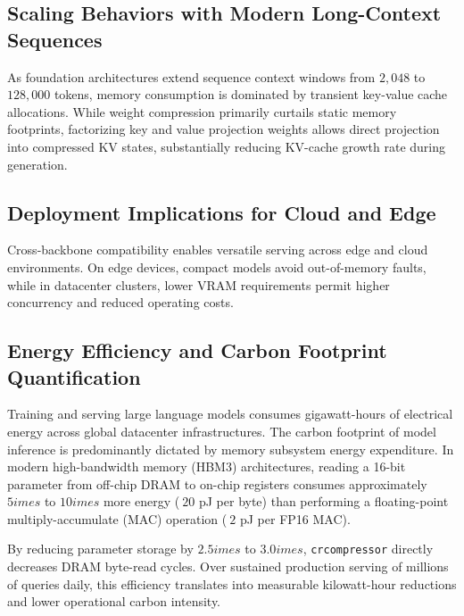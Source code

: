 \subsection{Scaling Behaviors with Modern Long-Context Sequences}
As foundation architectures extend sequence context windows from $2{,}048$ to $128{,}000$ tokens, memory consumption is dominated by transient key-value cache allocations. While weight compression primarily curtails static memory footprints, factorizing key and value projection weights allows direct projection into compressed KV states, substantially reducing KV-cache growth rate during generation.

\subsection{Deployment Implications for Cloud and Edge}
Cross-backbone compatibility enables versatile serving across edge and cloud environments. On edge devices, compact models avoid out-of-memory faults, while in datacenter clusters, lower VRAM requirements permit higher concurrency and reduced operating costs.

\subsection{Energy Efficiency and Carbon Footprint Quantification}
Training and serving large language models consumes gigawatt-hours of electrical energy across global datacenter infrastructures. The carbon footprint of model inference is predominantly dictated by memory subsystem energy expenditure. In modern high-bandwidth memory (HBM3) architectures, reading a 16-bit parameter from off-chip DRAM to on-chip registers consumes approximately $5	imes$ to $10	imes$ more energy ($~20$ pJ per byte) than performing a floating-point multiply-accumulate (MAC) operation ($~2$ pJ per FP16 MAC).

By reducing parameter storage by $2.5	imes$ to $3.0	imes$, \texttt{crcompressor} directly decreases DRAM byte-read cycles. Over sustained production serving of millions of queries daily, this efficiency translates into measurable kilowatt-hour reductions and lower operational carbon intensity.
